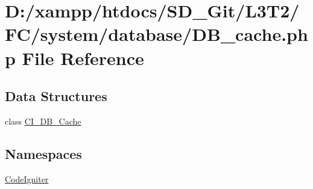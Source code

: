 \hypertarget{system_2database_2_d_b__cache_8php}{}\section{D\+:/xampp/htdocs/\+S\+D\+\_\+\+Git/\+L3\+T2/\+F\+C/system/database/\+D\+B\+\_\+cache.php File Reference}
\label{system_2database_2_d_b__cache_8php}
\subsection*{Data Structures}
\begin{DoxyCompactItemize}
\item 
class \hyperlink{class_c_i___d_b___cache}{C\+I\+\_\+\+D\+B\+\_\+\+Cache}
\end{DoxyCompactItemize}
\subsection*{Namespaces}
\begin{DoxyCompactItemize}
\item 
 \hyperlink{namespace_code_igniter}{Code\+Igniter}
\end{DoxyCompactItemize}
